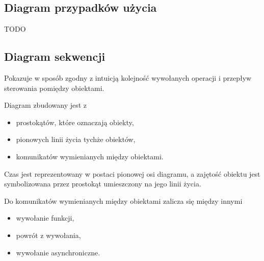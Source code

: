 \subsection{Diagram przypadków użycia}
TODO

\subsection{Diagram sekwencji}
Pokazuje w sposób zgodny z intuicją kolejność wywołanych operacji i przepływ sterowania pomiędzy obiektami.

Diagram zbudowany jest z
\begin{itemize}
	\item{prostokątów, które oznaczają obiekty,}
	\item{pionowych linii życia tychże obiektów,}
	\item{komunikatów wymienianych między obiektami.}
\end{itemize}

Czas jest reprezentowany w postaci pionowej osi diagramu, a zajętość obiektu jest symbolizowana przez prostokąt umieszczony na jego linii życia.

Do komunikatów wymienianych między obiektami zalicza się między innymi
\begin{itemize}
	\item{wywołanie funkcji,}
	\item{powrót z wywołania,}
	\item{wywołanie asynchroniczne.}
\end{itemize}





